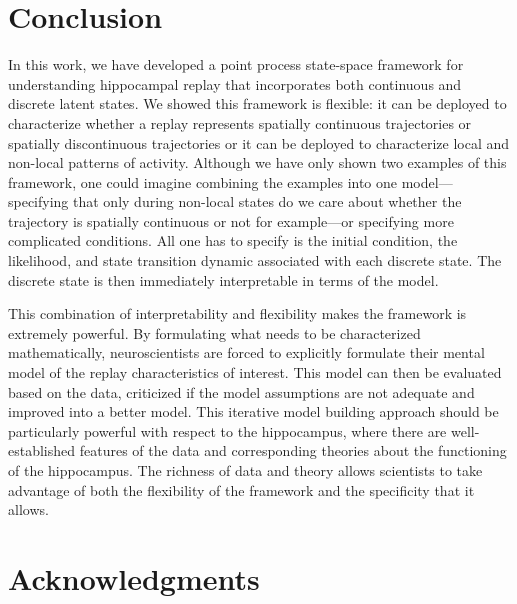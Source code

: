 \documentclass[conference]{IEEEtran}
\begin{document}
\section{Conclusion}
In this work, we have developed a point process state-space framework for understanding hippocampal replay that incorporates both continuous and discrete latent states. We showed this framework is flexible: it can be deployed to characterize whether a replay represents spatially continuous trajectories or spatially discontinuous trajectories or it can be deployed to characterize local and non-local patterns of activity. Although we have only shown two examples of this framework, one could imagine combining the examples into one model---specifying that only during non-local states do we care about whether the trajectory is spatially continuous or not for example---or specifying more complicated conditions. All one has to specify is the initial condition, the likelihood, and state transition dynamic associated with each discrete state. The discrete state is then immediately interpretable in terms of the model.

This combination of interpretability and flexibility makes the framework is extremely powerful. By formulating what needs to be characterized mathematically, neuroscientists are forced to explicitly formulate their mental model of the replay characteristics of interest. This model can then be evaluated based on the data, criticized if the model assumptions are not adequate and improved into a better model. This iterative model building approach should be particularly powerful with respect to the hippocampus, where there are well-established features of the data and corresponding theories about the functioning of the hippocampus. The richness of data and theory allows scientists to take advantage of both the flexibility of the framework and the specificity that it allows.


\section*{Acknowledgments}
\printbibliography
\end{document}
